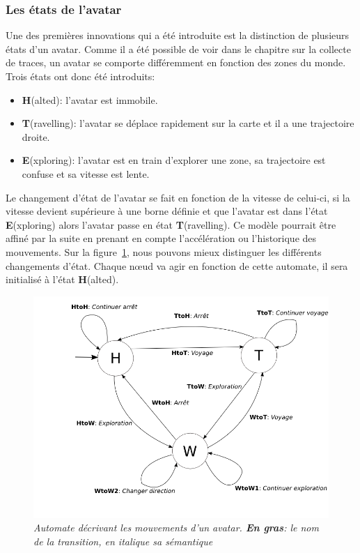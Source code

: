 	\subsubsection{Les états de l'avatar}
	\label{Automate}
	Une des premières innovations qui a été introduite est la distinction de plusieurs états d'un avatar. Comme il a été possible de voir dans le chapitre sur la collecte de traces, un avatar se comporte différemment en fonction des zones du monde. Trois états ont donc été introduits:
	\begin{itemize}
	\renewcommand{\labelitemi}{$\bullet$}
		\item \textbf{H}(alted): l'avatar est immobile.
		\item \textbf{T}(ravelling): l'avatar se déplace rapidement sur la carte et il a une trajectoire droite.  
		\item \textbf{E}(xploring): l'avatar est en train d'explorer une zone, sa trajectoire est confuse et sa vitesse est lente.
	\end{itemize} 
	Le changement d'état de l'avatar se fait en fonction de la vitesse de celui-ci, si la vitesse devient supérieure à une borne définie et que l'avatar est dans l'état \textbf{E}(xploring) alors l'avatar passe en état \textbf{T}(ravelling). Ce modèle pourrait être affiné par la suite en prenant en compte l'accélération ou l'historique des mouvements. Sur la figure~\ref{automateMob}, nous pouvons mieux distinguer les différents changements d'état. Chaque nœud va agir en fonction de cette automate, il sera initialisé à l'état \textbf{H}(alted). \\
	

	\begin{figure}[!h]
        \centering
        \includegraphics[scale=0.4]{./Ressources/Images/automate.png}
        \caption{\textit{\small Automate décrivant les mouvements d'un avatar. \textbf{En gras}: le nom de la transition, en \textit{italique} sa sémantique}}
        \label{automateMob}
        \end{figure}

